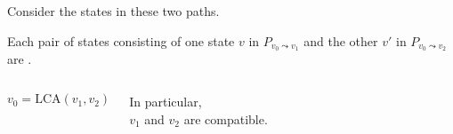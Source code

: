 \begin{frame}{}
  \centerline{ Consider the states in these two paths.}

  \begin{lemma}
    Each pair of states consisting of one state $v$ in $P_{v_0 \leadsto v_1}$ and the other $v'$ in $P_{v_0 \leadsto v_2}$ are .
  \end{lemma}

  \begin{columns}
	\[
	  v_0 = \text{LCA}(v_1, v_2)
	\]

	\vspace{0.50cm}
	\begin{center}
	  {In particular, \\ $v_1$ and $v_2$ are compatible.}
	\end{center}
  \end{columns}
\end{frame}
